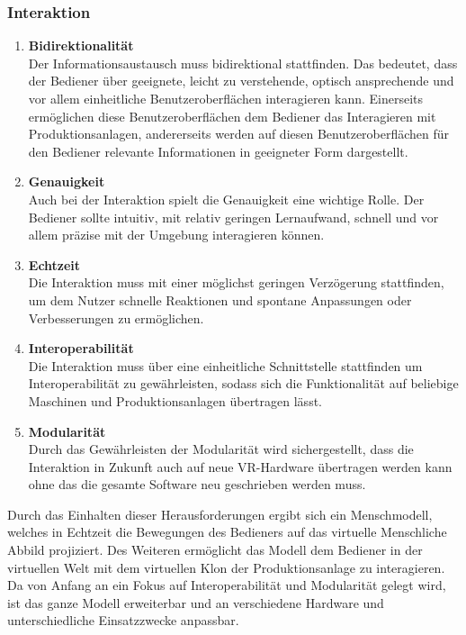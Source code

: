 \subsubsection{Interaktion}\label{sec:AnforderungenInteraktion}
\begin{enumerate}
	\item \textbf{Bidirektionalität} \\
	Der Informationsaustausch muss bidirektional stattfinden. Das bedeutet, dass der Bediener über geeignete, leicht zu verstehende, optisch ansprechende und vor allem einheitliche Benutzeroberflächen interagieren kann. Einerseits ermöglichen diese Benutzeroberflächen dem Bediener das Interagieren mit Produktionsanlagen, andererseits werden auf diesen Benutzeroberflächen für den Bediener relevante Informationen in geeigneter Form dargestellt.
	\item \textbf{Genauigkeit} \\
	Auch bei der Interaktion spielt die Genauigkeit eine wichtige Rolle. Der Bediener sollte intuitiv, mit relativ geringen Lernaufwand, schnell und vor allem präzise mit der Umgebung interagieren können.
	\item \textbf{Echtzeit} \\
	Die Interaktion muss mit einer möglichst geringen Verzögerung stattfinden, um dem Nutzer schnelle Reaktionen und spontane Anpassungen oder Verbesserungen zu ermöglichen.
	\item \textbf{Interoperabilität} \\
	Die Interaktion muss über eine einheitliche Schnittstelle stattfinden um Interoperabilität zu gewährleisten, sodass sich die Funktionalität auf beliebige Maschinen und Produktionsanlagen übertragen lässt.
	\item \textbf{Modularität} \\
	Durch das Gewährleisten der Modularität wird sichergestellt, dass die Interaktion in Zukunft auch auf neue VR-Hardware übertragen werden kann ohne das die gesamte Software neu geschrieben werden muss.
\end{enumerate}
Durch das Einhalten dieser Herausforderungen ergibt sich ein Menschmodell, welches in Echtzeit die Bewegungen des Bedieners auf das virtuelle Menschliche Abbild projiziert. Des Weiteren ermöglicht das Modell dem Bediener in der virtuellen Welt mit dem virtuellen Klon der Produktionsanlage zu interagieren. Da von Anfang an ein Fokus auf Interoperabilität und Modularität gelegt wird, ist das ganze Modell erweiterbar und an verschiedene Hardware und unterschiedliche Einsatzzwecke anpassbar.

